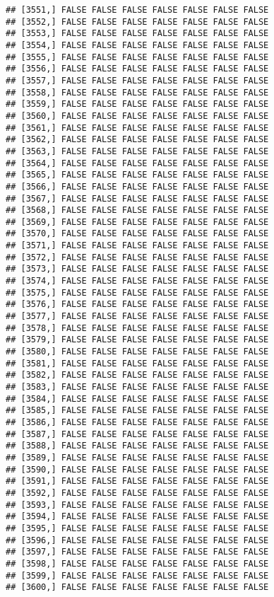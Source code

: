 \documentclass[
]{article}
\begin{document}
\begin{verbatim}
## [3551,] FALSE FALSE FALSE FALSE FALSE FALSE FALSE
## [3552,] FALSE FALSE FALSE FALSE FALSE FALSE FALSE
## [3553,] FALSE FALSE FALSE FALSE FALSE FALSE FALSE
## [3554,] FALSE FALSE FALSE FALSE FALSE FALSE FALSE
## [3555,] FALSE FALSE FALSE FALSE FALSE FALSE FALSE
## [3556,] FALSE FALSE FALSE FALSE FALSE FALSE FALSE
## [3557,] FALSE FALSE FALSE FALSE FALSE FALSE FALSE
## [3558,] FALSE FALSE FALSE FALSE FALSE FALSE FALSE
## [3559,] FALSE FALSE FALSE FALSE FALSE FALSE FALSE
## [3560,] FALSE FALSE FALSE FALSE FALSE FALSE FALSE
## [3561,] FALSE FALSE FALSE FALSE FALSE FALSE FALSE
## [3562,] FALSE FALSE FALSE FALSE FALSE FALSE FALSE
## [3563,] FALSE FALSE FALSE FALSE FALSE FALSE FALSE
## [3564,] FALSE FALSE FALSE FALSE FALSE FALSE FALSE
## [3565,] FALSE FALSE FALSE FALSE FALSE FALSE FALSE
## [3566,] FALSE FALSE FALSE FALSE FALSE FALSE FALSE
## [3567,] FALSE FALSE FALSE FALSE FALSE FALSE FALSE
## [3568,] FALSE FALSE FALSE FALSE FALSE FALSE FALSE
## [3569,] FALSE FALSE FALSE FALSE FALSE FALSE FALSE
## [3570,] FALSE FALSE FALSE FALSE FALSE FALSE FALSE
## [3571,] FALSE FALSE FALSE FALSE FALSE FALSE FALSE
## [3572,] FALSE FALSE FALSE FALSE FALSE FALSE FALSE
## [3573,] FALSE FALSE FALSE FALSE FALSE FALSE FALSE
## [3574,] FALSE FALSE FALSE FALSE FALSE FALSE FALSE
## [3575,] FALSE FALSE FALSE FALSE FALSE FALSE FALSE
## [3576,] FALSE FALSE FALSE FALSE FALSE FALSE FALSE
## [3577,] FALSE FALSE FALSE FALSE FALSE FALSE FALSE
## [3578,] FALSE FALSE FALSE FALSE FALSE FALSE FALSE
## [3579,] FALSE FALSE FALSE FALSE FALSE FALSE FALSE
## [3580,] FALSE FALSE FALSE FALSE FALSE FALSE FALSE
## [3581,] FALSE FALSE FALSE FALSE FALSE FALSE FALSE
## [3582,] FALSE FALSE FALSE FALSE FALSE FALSE FALSE
## [3583,] FALSE FALSE FALSE FALSE FALSE FALSE FALSE
## [3584,] FALSE FALSE FALSE FALSE FALSE FALSE FALSE
## [3585,] FALSE FALSE FALSE FALSE FALSE FALSE FALSE
## [3586,] FALSE FALSE FALSE FALSE FALSE FALSE FALSE
## [3587,] FALSE FALSE FALSE FALSE FALSE FALSE FALSE
## [3588,] FALSE FALSE FALSE FALSE FALSE FALSE FALSE
## [3589,] FALSE FALSE FALSE FALSE FALSE FALSE FALSE
## [3590,] FALSE FALSE FALSE FALSE FALSE FALSE FALSE
## [3591,] FALSE FALSE FALSE FALSE FALSE FALSE FALSE
## [3592,] FALSE FALSE FALSE FALSE FALSE FALSE FALSE
## [3593,] FALSE FALSE FALSE FALSE FALSE FALSE FALSE
## [3594,] FALSE FALSE FALSE FALSE FALSE FALSE FALSE
## [3595,] FALSE FALSE FALSE FALSE FALSE FALSE FALSE
## [3596,] FALSE FALSE FALSE FALSE FALSE FALSE FALSE
## [3597,] FALSE FALSE FALSE FALSE FALSE FALSE FALSE
## [3598,] FALSE FALSE FALSE FALSE FALSE FALSE FALSE
## [3599,] FALSE FALSE FALSE FALSE FALSE FALSE FALSE
## [3600,] FALSE FALSE FALSE FALSE FALSE FALSE FALSE

\end{verbatim}
\end{document}
